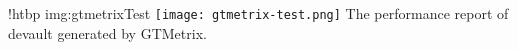 \namedfigure
{!htbp}
{img:gtmetrixTest}
{\texttt{[image: gtmetrix-test.png]}}
{The performance report of devault generated by GTMetrix.}
